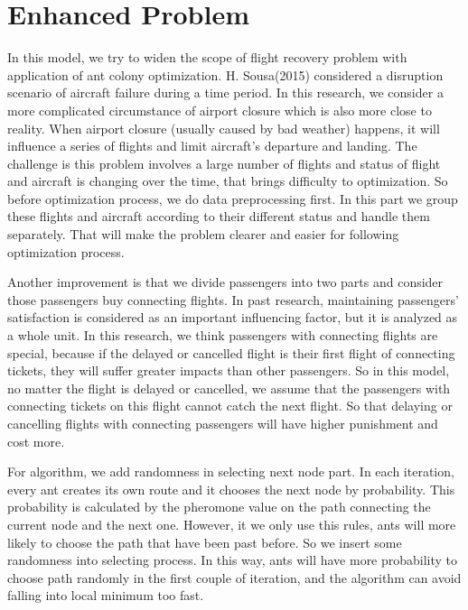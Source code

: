 \documentclass[senior]{IPSstyle}
\begin{document}
\section{Enhanced Problem} \label{innovation}
In this model, we try to widen the scope of flight recovery problem with application of ant colony optimization. H. Sousa(2015)\cite{sousa2015airline} considered a disruption scenario of aircraft failure during a time period. In this research, we consider a more complicated circumstance of airport closure which is also more close to reality. When airport closure (usually caused by bad weather) happens, it will influence a series of flights and limit aircraft’s departure and landing. The challenge is this problem involves a large number of flights and status of flight and aircraft is changing over the time, that brings difficulty to optimization. So before optimization process, we do data preprocessing first. In this part we group these flights and aircraft according to their different status and handle them separately. That will make the problem clearer and easier for following optimization process.

Another improvement is that we divide passengers into two parts and consider those passengers buy connecting flights. In past research\cite{sousa2015airline}, maintaining passengers’ satisfaction is considered as an important influencing factor, but it is analyzed as a whole unit. In this research, we think passengers with connecting flights are special, because if the delayed or cancelled flight is their first flight of connecting tickets, they will suffer greater impacts than other passengers. So in this model, no matter the flight is delayed or cancelled, we assume that the passengers with connecting tickets on this flight cannot catch the next flight. So that delaying or cancelling flights with connecting passengers will have higher punishment and cost more.

For algorithm, we add randomness in selecting next node part. In each iteration, every ant creates its own route and it chooses the next node by probability. This probability is calculated by the pheromone value on the path connecting the current node and the next one. However, it we only use this rules, ants will more likely to choose the path that have been past before. So we insert some randomness into selecting process. In this way, ants will have more probability to choose path randomly in the first couple of iteration, and the algorithm can avoid falling into local minimum too fast.
\end{document}
